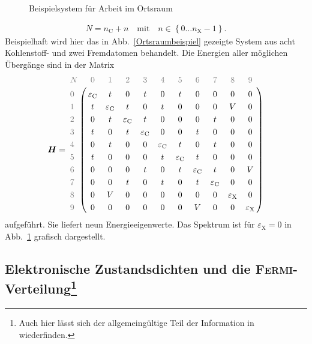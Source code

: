 \documentclass[a4paper, 10pt, twoside, openany]{book} %
\newcommand \braces[1]{\left \lbrace #1 \right \rbrace}
\def \vec {\boldsymbol}
\def \eC {\varepsilon_\mathrm{C}}
\def \eX {\varepsilon_\mathrm{X}}
\def \nC {n_\mathrm{C}}
\begin{document}
\begin{figure}
\begin{minipage}[b]{0.48\textwidth}
        \label{Ortsraumbeispiel DOS}
    \end{minipage}
    \caption{Beispielsystem für Arbeit im Ortsraum}
\end{figure}
%
\begin{align*}
    N = \nC + n \quad \text{mit} \quad n \in \braces{0 \dots n_\text{X} - 1}.
\end{align*}
%
Beispielhaft wird hier das in Abb.~\ref{Ortsraumbeispiel} gezeigte System aus acht Kohlenstoff- und zwei Fremdatomen behandelt. Die Energien aller möglichen Übergänge sind in der Matrix
%
\begin{align*}
    \vec H = \bordermatrix{
        \color{grey} N & \color{grey} 0 & \color{grey} 1 & \color{grey} 2 & \color{grey} 3 & \color{grey} 4 & \color{grey} 5 & \color{grey} 6 & \color{grey} 7 & \color{grey} 8 & \color{grey} 9 \cr
        \color{grey} 0 & \eC & t   & 0   & t   & 0   & t   & 0   & 0   & 0   & 0 \cr
        \color{grey} 1 & t   & \eC & t   & 0   & t   & 0   & 0   & 0   & V   & 0 \cr
        \color{grey} 2 & 0   & t   & \eC & t   & 0   & 0   & 0   & t   & 0   & 0 \cr
        \color{grey} 3 & t   & 0   & t   & \eC & 0   & 0   & t   & 0   & 0   & 0 \cr
        \color{grey} 4 & 0   & t   & 0   & 0   & \eC & t   & 0   & t   & 0   & 0 \cr
        \color{grey} 5 & t   & 0   & 0   & 0   & t   & \eC & t   & 0   & 0   & 0 \cr
        \color{grey} 6 & 0   & 0   & 0   & t   & 0   & t   & \eC & t   & 0   & V \cr
        \color{grey} 7 & 0   & 0   & t   & 0   & t   & 0   & t   & \eC & 0   & 0 \cr
        \color{grey} 8 & 0   & V   & 0   & 0   & 0   & 0   & 0   & 0   & \eX & 0 \cr
        \color{grey} 9 & 0   & 0   & 0   & 0   & 0   & 0   & V   & 0   & 0   & \eX }
\end{align*}
%
aufgeführt. Sie liefert neun Energieeigenwerte. Das Spektrum ist für $\eX = 0$ in Abb.~\ref{Ortsraumbeispiel DOS} grafisch dargestellt.

\subsection[Elektronische Zustandsdichten und die \textsc{Fermi}-Verteilung]{Elektronische Zustandsdichten und die \textsc{Fermi}-Verteilung\footnote{Auch hier lässt sich der allgemeingültige Teil der Information in \cite[S.~132f]{Czycholl} wiederfinden.}}
\label{Zustandsdichte}
\end{document}
